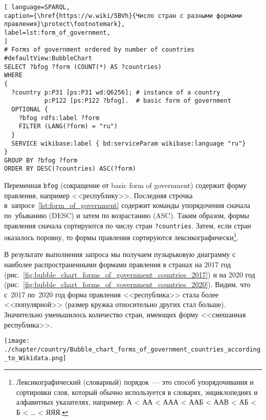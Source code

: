 \begin{lstlisting}[ language=SPARQL, 
caption={\href{https://w.wiki/5BVh}{Число стран с разными формами правления}\protect\footnotemark},
label=lst:form_of_government, 
]
# Forms of government ordered by number of countries
#defaultView:BubbleChart
SELECT ?bfog ?form (COUNT(*) AS ?countries)
WHERE 
{
  ?country p:P31 [ps:P31 wd:Q6256]; # instance of a country
           p:P122 [ps:P122 ?bfog].  # basic form of government
  OPTIONAL {
    ?bfog rdfs:label ?form
	FILTER (LANG(?form) = "ru")
  }
  SERVICE wikibase:label { bd:serviceParam wikibase:language "ru"}
}
GROUP BY ?bfog ?form
ORDER BY DESC(?countries) ASC(?form)
\end{lstlisting}



Переменная \lstinline|bfog| (сокращение от basic form of government) 
содержит форму правления, например <<республику>>. 
Последняя строчка в~запросе~\ref{lst:form_of_government} содержит команды упорядочения 
сначала по~убыванию (DESC) и затем по возрастанию (ASC). 
Таким образом, формы правления сначала сортируются по числу стран \lstinline|?countries|. 
Затем, если стран оказалось поровну, то формы правления сортируются лексикографически\footnote{%
%
Лексикографический (словарный) порядок~--- это способ упорядочивания и сортировки слов, 
который обычно используется в словарях, энциклопедиях и алфавитных указателях, 
например: А < АА < ААА < ААБ < ААВ < АБ < Б < … < ЯЯЯ.%
}.

В результате выполнения запроса мы получаем пузырьковую диаграмму с наиболее распространенными формами правления в странах на 2017 год (рис.~\ref{fig:bubble_chart_forms_of_government_countries_2017}) и на 2020 год (рис.~\ref{fig:bubble_chart_forms_of_government_countries_2020}).
Видим, что с~2017 по~2020 год 
форма правления <<республика>> стала более <<популярной>> 
(размер кружка относительно других стал больше). 
Значительно уменьшилось количество стран, имеющих форму  <<смешанная республика>>.

\begin{figure*}
    \centering
    \texttt{[image: ./chapter/country/Bubble\_chart\_forms\_of\_government\_countries\_according\_to\_Wikidata.png]}
    \caption[Формы правления стран, 2017 год.]{Пузырьковая диаграмма форм правления стран, 2017 год. Основные формы правления стран: республика (20~стран), конституционная монархия (18 стран), федеративная республика (18), парламентская республика (17), президентская республика (12~стран).} 
	\label{fig:bubble_chart_forms_of_government_countries_2017}%
\end{figure*} 


